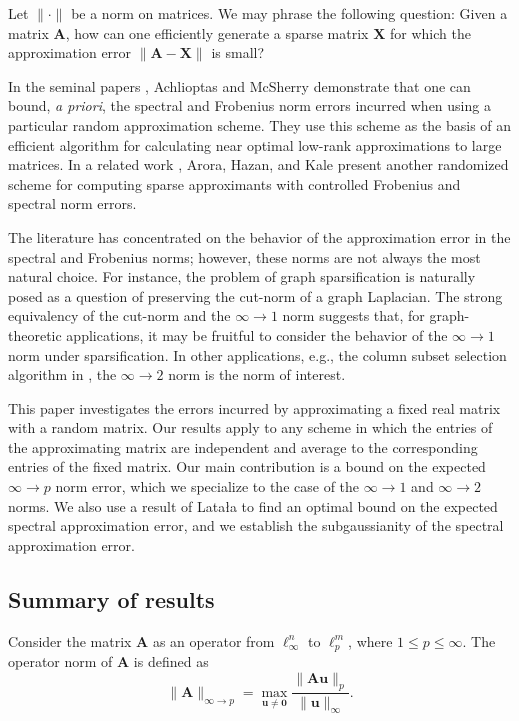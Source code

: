 \documentclass[11pt,letterpaper,twoside,reqno]{amsart}
\newcommand{\mat}[1]{\ensuremath{\bm{#1}}}
\newcommand{\infone}{\ensuremath{\infty\!\rightarrow\!\!1}}
\newcommand{\inftwo}{\ensuremath{\infty\!\rightarrow\!\!2}}
\newcommand{\infp}{\ensuremath{\infty\!\rightarrow\!p}}
\begin{document}
Let $\|\cdot\|$ be a norm on matrices. We may phrase the following question: Given a matrix $\mat{A}$, how can one efficiently generate a sparse matrix $\mat{X}$ for which the approximation error $\|\mat{A} - \mat{X}\|$ is small? 

In the seminal papers \cite{AM07,AM01}, Achlioptas and McSherry demonstrate that one can bound, \emph{a priori}, the spectral and Frobenius norm errors incurred when using a particular random approximation scheme. They use this scheme as the basis of an efficient algorithm for calculating near optimal low-rank approximations to large matrices. In a related work \cite{AHK06}, Arora, Hazan, and Kale present another randomized scheme for computing sparse approximants with controlled Frobenius and spectral norm errors.  


The literature has concentrated on the behavior of the approximation error in the spectral and Frobenius norms; however, these norms are not always the most natural choice. For instance, the problem of graph sparsification is naturally posed as a question of preserving the cut-norm of a graph Laplacian. The strong equivalency of the cut-norm and the $\infone$ norm suggests that, for graph-theoretic applications, it may be fruitful to consider the behavior of the $\infone$ norm under sparsification. In other applications, e.g., the column subset selection algorithm in \cite{Tropp09}, the $\inftwo$ norm is the norm of interest.

This paper investigates the errors incurred by approximating a fixed real matrix with a random matrix. Our results apply to any scheme in which the entries of the approximating matrix are independent and average to the corresponding entries of the fixed matrix. Our main contribution is a bound on the expected $\infp$ norm error, which we specialize to the case of the $\infone$ and $\inftwo$ norms. We also use a result of Lata{\l}a \cite{Lat04} to find an optimal bound on the expected spectral approximation error, and we establish the subgaussianity of the spectral approximation error.

\subsection{Summary of results}
Consider the matrix $\mat{A}$ as an operator from $\ell^n_\infty$ to $\ell^m_p$, where $1 \leq p \leq \infty$. The operator norm of $\mat{A}$ is defined as 
\[
\|\mat{A}\|_{\infty \rightarrow p} = \max_{\mat{u} \neq \mathbf{0}} \frac{\|\mat{A}\mat{u}\|_p}{\|\mat{u}\|_\infty}
.\]
\end{document}
